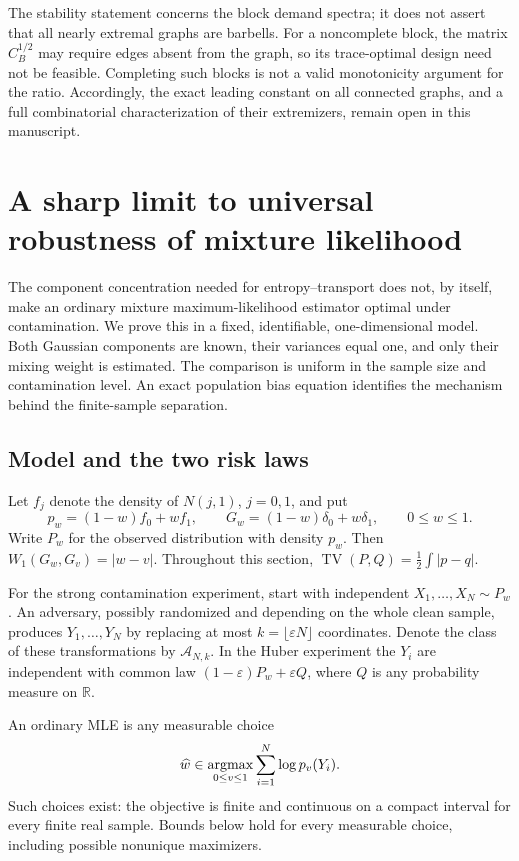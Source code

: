 \documentclass[11pt,a4paper]{article}
\theoremstyle{definition}
\theoremstyle{remark}
\numberwithin{equation}{section}
\begin{document}
The stability statement concerns the block demand spectra; it does
not assert that all nearly extremal graphs are barbells.
For a noncomplete block, the matrix $C_B^{1/2}$ may require edges
absent from the graph, so its trace-optimal design need not be
feasible.  Completing such blocks is not a valid monotonicity
argument for the ratio.
Accordingly, the exact leading constant on all connected graphs,
and a full combinatorial characterization of their extremizers,
remain open in this manuscript.



\section{A sharp limit to universal robustness of mixture likelihood}
\label{p4:eg:section}

The component concentration needed for entropy--transport does not, by
itself, make an ordinary mixture maximum-likelihood estimator optimal
under contamination. We prove this in a fixed, identifiable,
one-dimensional model. Both Gaussian components are known, their
variances equal one, and only their mixing weight is estimated.
The comparison is uniform in the sample size and contamination level.
An exact population bias equation identifies the mechanism behind the
finite-sample separation.

\subsection{Model and the two risk laws}

Let $f_j$ denote the density of $N(j,1)$, $j=0,1$, and put
\[
 p_w=(1-w)f_0+wf_1,\qquad
 G_w=(1-w)\delta_0+w\delta_1,\qquad 0\le w\le1.
\]
Write $P_w$ for the observed distribution with density $p_w$.
Then $W_1(G_w,G_v)=|w-v|$. Throughout this section,
$\operatorname{TV}(P,Q)=\frac12\int|p-q|$.

For the strong contamination experiment, start with independent
$X_1,\ldots,X_N\sim P_w$. An adversary, possibly randomized and
depending on the whole clean sample, produces $Y_1,\ldots,Y_N$ by
replacing at most $k=\lfloor\varepsilon N\rfloor$ coordinates. Denote
the class of these transformations by $\mathcal A_{N,k}$.
In the Huber experiment the $Y_i$ are independent with common law
$(1-\varepsilon)P_w+\varepsilon Q$, where $Q$ is any probability
measure on $\mathbb R$.

An ordinary MLE is any measurable choice
\[
 \widehat w\in\mathop{\rm argmax}_{0\le v\le1}
       \sum_{i=1}^N\log p_v(Y_i).
\]
Such choices exist: the objective is finite and continuous on a compact
interval for every finite real sample. Bounds below hold for every
measurable choice, including possible nonunique maximizers.
\end{document}
